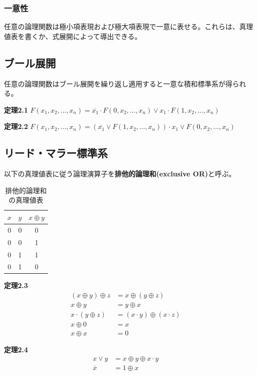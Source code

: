 \documentclass[a4j,10pt,oneside,openany,fleqn]{jsbook}
\begin{document}
\subsubsection{一意性}
任意の論理関数は極小項表現および極大項表現で一意に表せる。これらは、真理値表を書くか、式展開によって導出できる。

\subsection{ブール展開}
任意の論理関数はブール展開を繰り返し適用すると一意な積和標準系が得られる。


\textbf{定理2.1}
$F(x_1, x_2, \dots, x_n) = \overline{x_1} \cdot F(0, x_2, \dots, x_n) \vee x_1 \cdot F(1, x_2, \dots, x_n) $

\textbf{定理2.2}
$F(x_1, x_2, \dots, x_n) = (\overline{x_1} \vee F(1, x_2, \dots, x_n)) \cdot x_1 \vee F(0, x_2, \dots, x_n) $

\subsection{リード・マラー標準系}
以下の真理値表に従う論理演算子を\textbf{排他的論理和(exclusive OR)}と呼ぶ。

\begin{table}[htb]
  \begin{center}
    \begin{tabular}{cc|c} 
      $x$ & $y$ & $x\oplus y$ \\ \hline 
      0 & 0 & 0 \\
      0 & 0 & 1 \\
      0 & 1 & 1 \\
      0 & 1 & 0 \\
    \end{tabular}
  \end{center}
  \caption{排他的論理和の真理値表}
\end{table}

\textbf{定理2.3}
\begin{align*}
  (x \oplus y) \oplus z &= x \oplus ( y \oplus z)&\\
  x \oplus y &= y \oplus x&\\
  x \cdot ( y \oplus z) &= (x \cdot y) \oplus ( x \cdot z)&\\
  x \oplus 0 &=x &\\
  x \oplus x &=0&
\end{align*}

\textbf{定理2.4}
\begin{align*}
  x \vee y &= x \oplus y \oplus x \cdot y&\\
  \overline{x} &= 1 \oplus x&
\end{align*}
\end{document}
